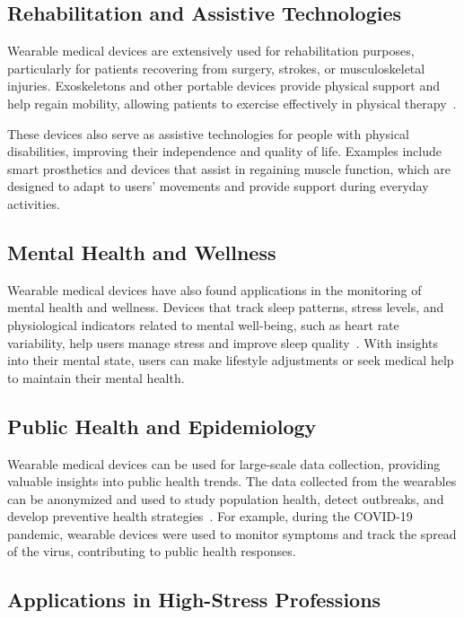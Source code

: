 \documentclass[journal]{IEEEtran}
\begin{document}
    \subsection{Rehabilitation and Assistive Technologies}

    Wearable medical devices are extensively used for rehabilitation purposes, particularly for patients recovering from surgery, strokes, or musculoskeletal injuries. Exoskeletons and other portable devices provide physical support and help regain mobility, allowing patients to exercise effectively in physical therapy~\cite{Hemapriya2017}.

    These devices also serve as assistive technologies for people with physical disabilities, improving their independence and quality of life. Examples include smart prosthetics and devices that assist in regaining muscle function, which are designed to adapt to users' movements and provide support during everyday activities.

    \subsection{Mental Health and Wellness}

    Wearable medical devices have also found applications in the monitoring of mental health and wellness. Devices that track sleep patterns, stress levels, and physiological indicators related to mental well-being, such as heart rate variability, help users manage stress and improve sleep quality~\cite{Iqbal2016}. With insights into their mental state, users can make lifestyle adjustments or seek medical help to maintain their mental health.

    \subsection{Public Health and Epidemiology}

    Wearable medical devices can be used for large-scale data collection, providing valuable insights into public health trends. The data collected from the wearables can be anonymized and used to study population health, detect outbreaks, and develop preventive health strategies~\cite{Cusack2024}. For example, during the COVID-19 pandemic, wearable devices were used to monitor symptoms and track the spread of the virus, contributing to public health responses.

    \subsection{Applications in High-Stress Professions}
\end{document}
